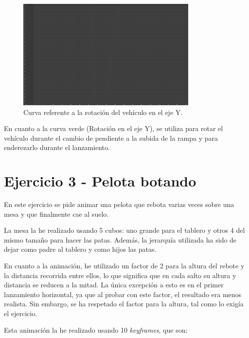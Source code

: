 \documentclass{article}
\begin{document}
\begin{figure}[H]
    \centering
    \includegraphics[width=0.8\textwidth]{imagenes/Ejercicio2/corregidas/curvas/green.png}
    \caption{Curva referente a la rotación del vehículo en el eje Y.}
\end{figure}

\bigskip

En cuanto a la curva verde (Rotación en el eje Y), se utiliza para rotar el vehículo durante el cambio de pendiente a la subida de la rampa y para enderezarlo durante el lanzamiento.


\section{Ejercicio 3 - Pelota botando}

En este ejercicio se pide animar una pelota que rebota varias veces sobre una mesa y que finalmente cae al suelo.

\bigskip

La mesa la he realizado usando 5 cubos: uno grande para el tablero y otros 4 del mismo tamaño para hacer las patas. Además, la jerarquía utilizada ha sido de dejar como padre al tablero y como hijos las patas.

\bigskip

En cuanto a la animación, he utilizado un factor de 2 para la altura del rebote y la distancia recorrida entre ellos, lo que significa que en cada salto su altura y distancia se reducen a la mitad. La única excepción a esto es en el primer lanzamiento horizontal, ya que al probar con este factor, el resultado era menos realista. Sin embargo, se ha respetado el factor para la altura, tal como lo exigía el ejercicio.

\bigskip

Esta animación la he realizado usando 10 \textit{keyframes}, que son:
\end{document}
